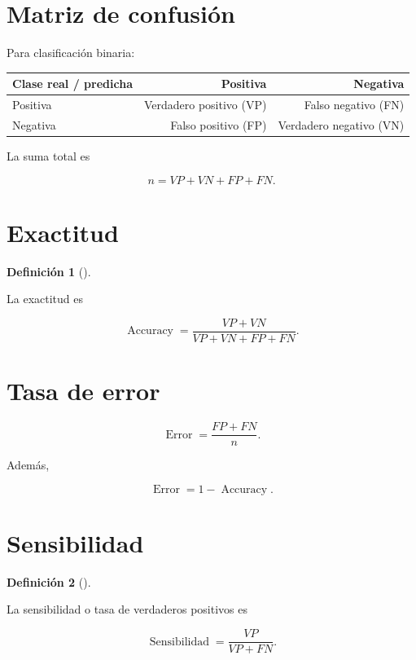\documentclass[
  spanish,
  11pt,
  letterpaper,
  DIV=11,
  numbers=noendperiod]{scrreprt}
\newcounter{none} %
\theoremstyle{definition}
\newtheorem{definition}{Definición}[chapter]
\theoremstyle{plain}
\theoremstyle{definition}
\theoremstyle{remark}
\begin{document}
\section{Matriz de confusión}\label{matriz-de-confusiuxf3n}

Para clasificación binaria:

{\def\LTcaptype{none} %
\begin{longtable}[]{@{}lrr@{}}
\toprule\noalign{}
Clase real / predicha & Positiva & Negativa \\
\midrule\noalign{}
\endhead
\bottomrule\noalign{}
\endlastfoot
Positiva & Verdadero positivo (VP) & Falso negativo (FN) \\
Negativa & Falso positivo (FP) & Verdadero negativo (VN) \\
\end{longtable}
}

La suma total es

\[
n
=
VP+VN+FP+FN.
\]

\section{Exactitud}\label{exactitud}

\begin{definition}[]\protect\hypertarget{def-exactitud}{}\label{def-exactitud}

La exactitud es

\[
\operatorname{Accuracy}
=
\frac{
VP+VN
}{
VP+VN+FP+FN
}.
\]

\end{definition}

\section{Tasa de error}\label{tasa-de-error}

\[
\operatorname{Error}
=
\frac{
FP+FN
}{
n
}.
\]

Además,

\[
\operatorname{Error}
=
1-\operatorname{Accuracy}.
\]

\section{Sensibilidad}\label{sensibilidad}

\begin{definition}[]\protect\hypertarget{def-sensibilidad}{}\label{def-sensibilidad}

La sensibilidad o tasa de verdaderos positivos es

\[
\operatorname{Sensibilidad}
=
\frac{
VP
}{
VP+FN
}.
\]

\end{definition}
\end{document}
